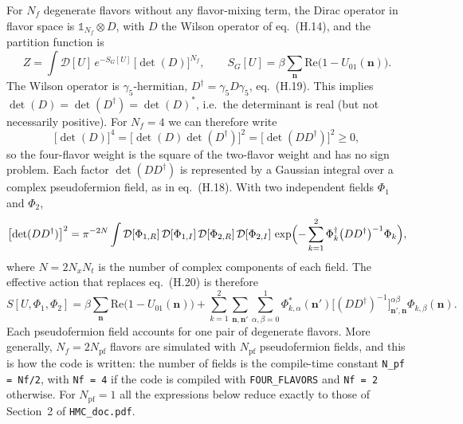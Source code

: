 \documentclass[11pt,a4paper]{article}
\newcommand{\n}{\mathbf{n}}
\newcommand{\Nf}{N_f}
\newcommand{\Npf}{N_{\mathrm{pf}}}
\newcommand{\code}[1]{\texttt{#1}}
\newcommand{\hmcdoc}{\texttt{HMC\_doc.pdf}}
\begin{document}
For $\Nf$ degenerate flavors without any flavor-mixing term, the Dirac operator in flavor space is
$\mathbb{1}_{\Nf}\otimes D$, with $D$ the Wilson operator of eq.~(H.14), and the partition function is
\begin{equation}
    Z = \int \mathcal{D}[U]\, e^{-S_G[U]}\, \bigl[\det(D)\bigr]^{\Nf},
    \qquad
    S_G[U] = \beta \sum_{\n} \mathrm{Re}\bigl(1-U_{01}(\n)\bigr).
    \label{eq:Z}
\end{equation}
The Wilson operator is $\gamma_5$-hermitian, $D^\dagger = \gamma_5 D \gamma_5$, eq.~(H.19). This implies
$\det(D) = \det(D^\dagger) = \det(D)^*$, i.e.\ the determinant is real (but not necessarily positive). For
$\Nf = 4$ we can therefore write
\begin{equation}
    \bigl[\det(D)\bigr]^4 = \bigl[\det(D)\det(D^\dagger)\bigr]^2 = \bigl[\det(DD^\dagger)\bigr]^2 \geq 0,
    \label{eq:det4}
\end{equation}
so the four-flavor weight is the square of the two-flavor weight and has no sign problem. Each factor
$\det(DD^\dagger)$ is represented by a Gaussian integral over a complex pseudofermion field, as in eq.~(H.18).
With two independent fields $\Phi_1$ and $\Phi_2$,
\begin{equation}
    \bigl[\det(DD^\dagger)\bigr]^2
    = \pi^{-2N} \int \mathcal{D}[\Phi_{1,R}]\,\mathcal{D}[\Phi_{1,I}]\,\mathcal{D}[\Phi_{2,R}]\,\mathcal{D}[\Phi_{2,I}]\,
      \exp\Bigl(-\sum_{k=1}^{2} \Phi_k^\dagger \bigl(DD^\dagger\bigr)^{-1} \Phi_k\Bigr),
    \label{eq:pf}
\end{equation}
where $N = 2N_xN_t$ is the number of complex components of each field. The effective action that replaces
eq.~(H.20) is therefore
\begin{equation}
    S[U,\Phi_1,\Phi_2] = \beta \sum_{\n} \mathrm{Re}\bigl(1-U_{01}(\n)\bigr)
    + \sum_{k=1}^{2} \sum_{\n,\n'} \sum_{\alpha,\beta=0}^{1}
      \Phi_{k,\alpha}^*(\n') \bigl[(DD^\dagger)^{-1}\bigr]^{\alpha\beta}_{\n',\n} \Phi_{k,\beta}(\n).
    \label{eq:S}
\end{equation}
Each pseudofermion field accounts for one pair of degenerate flavors. More generally, $\Nf = 2\Npf$ flavors are
simulated with $\Npf$ pseudofermion fields, and this is how the code is written: the number of fields is the
compile-time constant \code{N\_pf = Nf/2}, with \code{Nf = 4} if the code is compiled with \code{FOUR\_FLAVORS}
and \code{Nf = 2} otherwise. For $\Npf = 1$ all the expressions below reduce exactly to those of Section~2 of
\hmcdoc.

\end{document}
